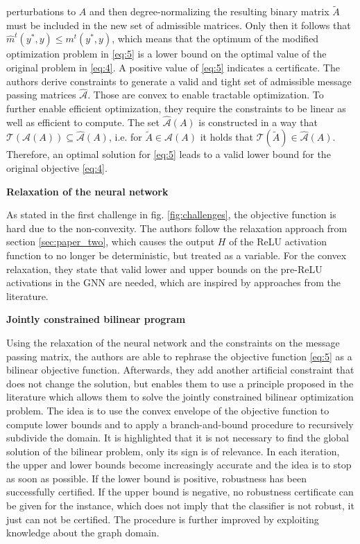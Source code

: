 \documentclass[a4paper,preprint]{sig-alternate}
\begin{document}
perturbations to $A$ and then degree-normalizing the resulting binary matrix $\tilde{A}$ must be included in the new set of admissible matrices.
Only then it follows that $\hat{m}^t (y^{\ast}, y) \leq m^t (y^{\ast}, y)$, which means that the optimum of the modified optimization problem in
\ref{eq:5} is a lower bound on the optimal value of the original problem in \ref{eq:4}. A positive value of \ref{eq:5} indicates a certificate.
The authors derive constraints to generate a valid and tight set of admissible message passing matrices $\mathcal{\hat{A}}$.
Those are convex to enable tractable optimization. To further enable efficient optimization, they require the constraints to be linear
as well as efficient to compute. The set $\mathcal{\hat{A}}(A)$ is constructed in a way that $\mathcal{T}(\mathcal{A}(A)) \subseteq \mathcal{\hat{A}}(A)$,
i.e. for $\tilde{A} \in \mathcal{A}(A)$ it holds that $\mathcal{T}(\tilde{A}) \in \mathcal{\hat{A}}(A)$.
Therefore, an optimal solution for \ref{eq:5} leads to a valid lower bound for the original objective \ref{eq:4}.\newline

\textbf{Relaxation of the neural network}\newline

As stated in the first challenge in fig. \ref{fig:challenges}, the objective function is hard due to the non-convexity. The authors follow the relaxation approach 
from section \ref{sec:paper_two}, which causes the output $H$ of the ReLU activation function to no longer be deterministic, 
but treated as a variable. For the convex relaxation, they state that valid lower and upper bounds on the pre-ReLU activations 
in the GNN are needed, which are inspired by approaches from the literature.\newline

\textbf{Jointly constrained bilinear program}\newline

Using the relaxation of the neural network and the constraints on the message passing matrix, the authors are able to
rephrase the objective function \ref{eq:5} as a bilinear objective function.
Afterwards, they add another artificial constraint that does not change the solution, but enables them to use 
a principle proposed in the literature which allows them to solve the jointly constrained bilinear optimization problem. 
The idea is to use the convex envelope of the objective function to compute lower bounds 
and to apply a branch-and-bound procedure to recursively subdivide the domain.\newline
It is highlighted that it is not necessary to find the global solution of the bilinear problem, 
only its sign is of relevance. In each iteration, the upper and lower bounds become increasingly accurate and the idea is to 
stop as soon as possible. If the lower bound is positive, robustness has been successfully certified. If the upper bound is negative, 
no robustness certificate can be given for the instance, which does not imply that the classifier is not robust, 
it just can not be certified. The procedure is further improved by exploiting knowledge about the graph domain.\newline
\end{document}
